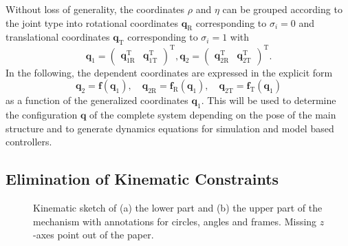 \documentclass{svproc}
\newcommand{\bm}[1]{\boldsymbol{#1}}
\newcommand{\transp}[0]{{\mathrm{T}}}
\begin{document}
Without loss of generality, the coordinates $\rho$ and $\eta$ can be grouped according to the joint type into rotational coordinates $\bm{q}_{\mathrm{R}}$ corresponding to $\sigma_i=0$ and translational coordinates $\bm{q}_{\mathrm{T}}$ corresponding to $\sigma_i=1$ with
%
\begin{equation}
\bm{q}_1=\begin{pmatrix}\bm{q}_{1\mathrm{R}}^\transp & \bm{q}_{1\mathrm{T}}^\transp \end{pmatrix}^\transp,
\bm{q}_2=\begin{pmatrix}\bm{q}_{2\mathrm{R}}^\transp & \bm{q}_{2\mathrm{T}}^\transp \end{pmatrix}^\transp.
\label{equ:q12_sep_transl_rot}
\end{equation}
%
In the following, the dependent coordinates are expressed in the explicit form
%
\begin{equation}
\bm{q}_2 = \bm{f}(\bm{q}_1) \label{equ:kinconstr_explicit},
\quad \bm{q}_{2\mathrm{R}} = \bm{f}_{\mathrm{R}}(\bm{q}_1), 
\quad \bm{q}_{2\mathrm{T}} = \bm{f}_{\mathrm{T}}(\bm{q}_1)
\end{equation}
%
as a function of the generalized coordinates $\bm{q}_1$.
This will be used to determine the configuration $\bm{q}$ of the complete system depending on the pose of the main structure and to generate dynamics equations for simulation and model based controllers.

\subsection{Elimination of Kinematic Constraints}
\label{sec:model_elim}


\begin{figure}[tb]
    \begin{center}
        {}
    \end{center}
    \caption{Kinematic sketch of (a) the lower part and (b) the upper part of the mechanism with annotations for circles, angles and frames. Missing $z$-axes point out of the paper.}
    \label{fig:KAS5_detail}
\end{figure}
\end{document}
